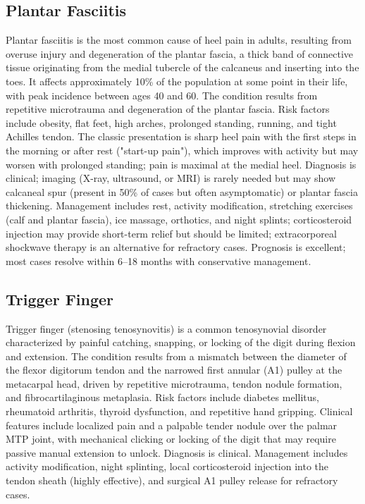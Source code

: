 \subsection{Plantar Fasciitis}
\label{sec:Plantar Fasciitis}
Plantar fasciitis is the most common cause of heel pain in adults, resulting from overuse injury and degeneration of the plantar fascia, a thick band of connective tissue originating from the medial tubercle of the calcaneus and inserting into the toes. It affects approximately 10\% of the population at some point in their life, with peak incidence between ages 40 and 60. The condition results from repetitive microtrauma and degeneration of the plantar fascia. Risk factors include obesity, flat feet, high arches, prolonged standing, running, and tight Achilles tendon. The classic presentation is sharp heel pain with the first steps in the morning or after rest ("start-up pain"), which improves with activity but may worsen with prolonged standing; pain is maximal at the medial heel. Diagnosis is clinical; imaging (X-ray, ultrasound, or MRI) is rarely needed but may show calcaneal spur (present in 50\% of cases but often asymptomatic) or plantar fascia thickening. Management includes rest, activity modification, stretching exercises (calf and plantar fascia), ice massage, orthotics, and night splints; corticosteroid injection may provide short-term relief but should be limited; extracorporeal shockwave therapy is an alternative for refractory cases. Prognosis is excellent; most cases resolve within 6--18 months with conservative management.

\subsection{Trigger Finger}
\label{sec:Trigger Finger}
Trigger finger (stenosing tenosynovitis) is a common tenosynovial disorder characterized by painful catching, snapping, or locking of the digit during flexion and extension. The condition results from a mismatch between the diameter of the flexor digitorum tendon and the narrowed first annular (A1) pulley at the metacarpal head, driven by repetitive microtrauma, tendon nodule formation, and fibrocartilaginous metaplasia. Risk factors include diabetes mellitus, rheumatoid arthritis, thyroid dysfunction, and repetitive hand gripping. Clinical features include localized pain and a palpable tender nodule over the palmar MTP joint, with mechanical clicking or locking of the digit that may require passive manual extension to unlock. Diagnosis is clinical. Management includes activity modification, night splinting, local corticosteroid injection into the tendon sheath (highly effective), and surgical A1 pulley release for refractory cases.


